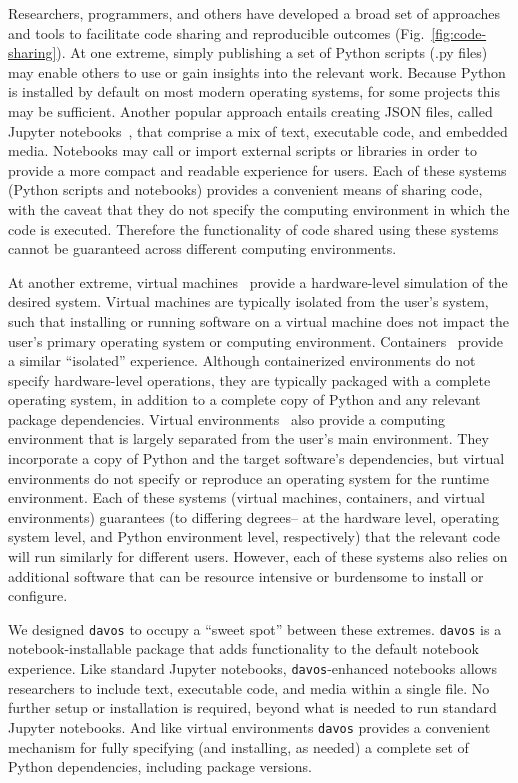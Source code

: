\documentclass[preprint,12pt, a4paper]{elsarticle}
\begin{document}
Researchers, programmers, and others have developed a broad
set of approaches and tools to facilitate code sharing and
reproducible outcomes (Fig.~\ref{fig:code-sharing}).  At one
extreme, simply publishing a set of Python scripts (.py files) may
enable others to use or gain insights into the relevant work.  Because
Python is installed by default on most modern operating systems, for
some projects this may be sufficient.  Another popular approach
entails creating JSON files, called Jupyter
notebooks~\citep{KluyEtal16}, that comprise a mix of text, executable
code, and embedded media.  Notebooks may call or import external
scripts or libraries in order to provide a more compact and readable
experience for users.  Each of these systems (Python scripts and
notebooks) provides a convenient means of sharing code, with the
caveat that they do not specify the computing environment in which the
code is executed.  Therefore the functionality of code shared using
these systems cannot be guaranteed across different computing
environments.

At another extreme, virtual machines~\citep{Gold74, AltiEtal05,
  Rose99} provide a hardware-level simulation of the desired system.
Virtual machines are typically isolated from the user's system, such
that installing or running software on a virtual machine does not
impact the user's primary operating system or computing environment.
Containers~\citep[e.g.,][]{Merk14, KurtEtal17} provide a similar
``isolated'' experience.  Although containerized environments do not
specify hardware-level operations, they are typically packaged with a
complete operating system, in addition to a complete copy of Python
and any relevant package dependencies.  Virtual
environments~\citep[e.g.,][]{vanREtal14} also provide a computing
environment that is largely separated from the user's main
environment.  They incorporate a copy of Python and the target
software's dependencies, but virtual environments do not specify or
reproduce an operating system for the runtime environment.  Each of
these systems (virtual machines, containers, and virtual environments)
guarantees (to differing degrees-- at the hardware level, operating
system level, and Python environment level, respectively) that the
relevant code will run similarly for different users.  However, each
of these systems also relies on additional software that can be
resource intensive or burdensome to install or configure.

We designed \texttt{davos} to occupy a ``sweet spot'' between these
extremes.  \texttt{davos} is a notebook-installable package that adds
functionality to the default notebook experience.  Like standard
Jupyter notebooks, \texttt{davos}-enhanced notebooks allows
researchers to include text, executable code, and media within a
single file.  No further setup or installation is required, beyond
what is needed to run standard Jupyter notebooks.  And like virtual
environments \texttt{davos} provides a convenient mechanism for fully
specifying (and installing, as needed) a complete set of Python
dependencies, including package versions.
\end{document}
